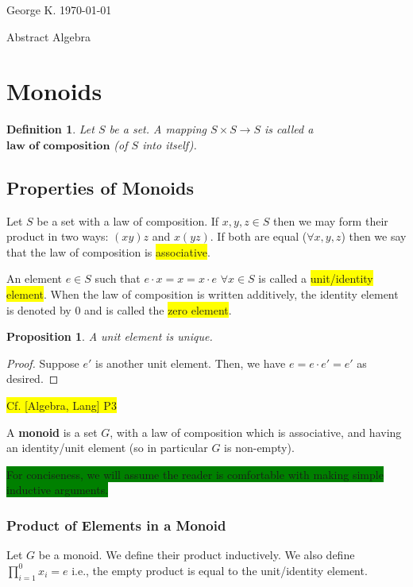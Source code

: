 \documentclass[12pt]{article}
\newcommand{\mybox}[2][black]{\colorbox{#1}{#2}}
\newtheorem{definition}{Definition}
\newtheorem{proposition}{Proposition}
\begin{document}
\thispagestyle{empty}
\tableofcontents
\clearpage
\pagestyle{fancy}

\noindent George K. \hfill \today

\begin{center}
{\large Abstract Algebra}
\end{center}

\section{Monoids}
\begin{definition}
   
Let $S$ be a set. A mapping
 $S \times S \rightarrow S$ 
is called a $\textbf{law of composition}$ (of $S$ into itself).


\end{definition}

\subsection{Properties of Monoids}
Let $S$ be a set with a law of composition. If $x,y,z \in S$ then we may form their product in two ways: $(xy)z$ and $x(yz)$. If both are equal ($\forall x,y,z$) then we say that the law of composition is \mybox[yellow]{associative}.

An element $e \in S$ such that $e \cdot x = x = x \cdot e$ $\forall x \in S$ is called a \mybox[yellow]{unit/identity element}. When the law of composition is written additively, the identity element is denoted by $0$ and is called the \mybox[yellow]{zero element}.

\begin{proposition}
A unit element is unique.
\end{proposition}
\begin{proof}
Suppose $e'$ is another unit element. Then, we have $e = e \cdot e' = e'$ as desired.
\end{proof}
\mybox[yellow]{Cf. [Algebra, Lang] P3}

A \textbf{monoid} is a set $G$, with a law of composition which is associative, and having an identity/unit element (so in particular $G$ is non-empty).

\mybox[green]{For conciseness, we will assume the reader is comfortable with making simple inductive arguments.}

\subsubsection{Product of Elements in a Monoid}
Let $G$ be a monoid. We define their product inductively. We also define $\prod_{i=1}^{0} x_{i} = e$ i.e., the empty product is equal to the unit/identity element.
\end{document}
